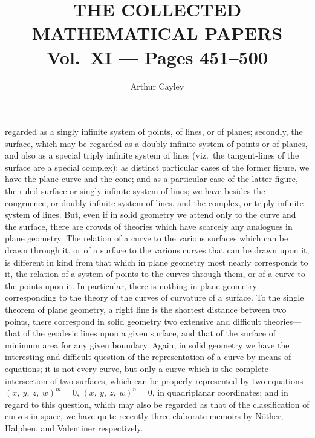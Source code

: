 \documentclass[12pt,a4paper,oneside]{book}
\title{\vspace{-2em}THE COLLECTED MATHEMATICAL PAPERS\\Vol.~XI --- Pages 451--500}
\author{Arthur Cayley}
\date{}
\begin{document}
\maketitle
\setcounter{page}{451}



\medskip

regarded as a singly infinite system of points, of lines, or of planes; secondly, the surface, which may be regarded as a doubly infinite system of points or of planes, and also as a special triply infinite system of lines (viz.\ the tangent-lines of the surface are a special complex): as distinct particular cases of the former figure, we have the plane curve and the cone; and as a particular case of the latter figure, the ruled surface or singly infinite system of lines; we have besides the congruence, or doubly infinite system of lines, and the complex, or triply infinite system of lines. But, even if in solid geometry we attend only to the curve and the surface, there are crowds of theories which have scarcely any analogues in plane geometry. The relation of a curve to the various surfaces which can be drawn through it, or of a surface to the various curves that can be drawn upon it, is different in kind from that which in plane geometry most nearly corresponds to it, the relation of a system of points to the curves through them, or of a curve to the points upon it. In particular, there is nothing in plane geometry corresponding to the theory of the curves of curvature of a surface. To the single theorem of plane geometry, a right line is the shortest distance between two points, there correspond in solid geometry two extensive and difficult theories---that of the geodesic lines upon a given surface, and that of the surface of minimum area for any given boundary. Again, in solid geometry we have the interesting and difficult question of the representation of a curve by means of equations; it is not every curve, but only a curve which is the complete intersection of two surfaces, which can be properly represented by two equations $(x,\ y,\ z,\ w)^{m}=0$, $(x,\ y,\ z,\ w)^{n}=0$, in quadriplanar coordinates; and in regard to this question, which may also be regarded as that of the classification of curves in space, we have quite recently three elaborate memoirs by N\"other, Halphen, and Valentiner respectively.
\end{document}
